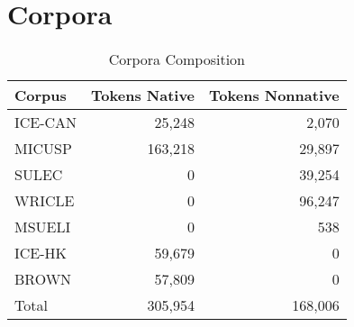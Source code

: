 \documentclass[main.tex]{subfiles}
\begin{document}
\section{Corpora}

\begin{table}[htbp]
\small
\centering
\caption{Corpora Composition}
  \begin{tabular}{  l  r  r }
  \toprule
    Corpus & Tokens Native & Tokens Nonnative \\ \midrule
    ICE-CAN & 25,248 & 2,070 \\
    MICUSP & 163,218  & 29,897 \\
    SULEC & 0 & 39,254 \\
    WRICLE & 0 & 96,247  \\
    MSUELI & 0 & 538 \\
    ICE-HK & 59,679 & 0 \\
    BROWN & 57,809 & 0 \\ \midrule
    Total & 305,954 & 168,006 \\
    \bottomrule
  \end{tabular}
\label{table:corpora}
\end{table}

\biblio
\end{document}
